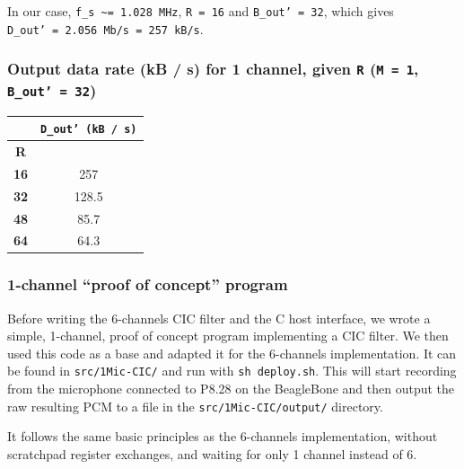 \documentclass[]{report}
\begin{document}
In our case, \texttt{f\_s\ \textasciitilde{}=\ 1.028\ MHz},
\texttt{R\ =\ 16} and \texttt{B\_out'\ =\ 32}, which
gives \texttt{D\_out'\ =\ 2.056\ Mb/s\ =\ 257\ kB/s}.

\hypertarget{output-data-rate-kb-s-for-1-channel-given-r-m-1-b_out-32}{%
\subsubsection{\texorpdfstring{Output data rate (kB / s) for 1 channel,
given \texttt{R} (\texttt{M\ =\ 1},
\texttt{B\_out'\ =\ 32})}{Output data rate (kB / s) for 1 channel, given R (M = 1, B\_out' = 32)}}\label{output-data-rate-kb-s-for-1-channel-given-r-m-1-b_out-32}}

\begin {table}[H]
\begin{center}
\begin{tabular}{|c|c|}
	\hline  & \textbf{\texttt{D\_out'\ (kB\ /\ s)}} \\ 
	\hline \textbf{R} &  \\ 
	\hline \textbf{16} & 257 \\ 
	\hline \textbf{32} & 128.5 \\ 
	\hline \textbf{48} & 85.7 \\ 
	\hline \textbf{64} & 64.3 \\ 
	\hline 
\end{tabular} 
\end{center}
\end{table}



\hypertarget{channel-proof-of-concept-program}{%
\subsubsection{1-channel ``proof of concept''
program}\label{channel-proof-of-concept-program}}

Before writing the 6-channels CIC filter and the C host interface, we
wrote a simple, 1-channel, proof of concept program implementing a CIC
filter. We then used this code as a base and adapted it for the
6-channels implementation. It can be found in \texttt{src/1Mic-CIC/} and
run with \texttt{sh\ deploy.sh}. This will start recording from the
microphone connected to P8.28 on the BeagleBone and then output the raw
resulting PCM to a file in the \texttt{src/1Mic-CIC/output/} directory.

It follows the same basic principles as the 6-channels implementation,
without scratchpad register exchanges, and waiting for only 1 channel
instead of 6.
\end{document}
